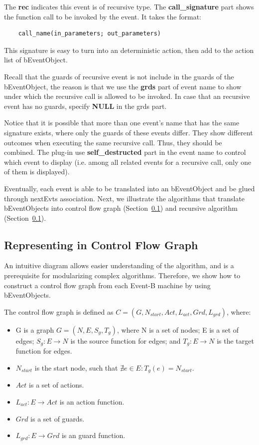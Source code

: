 \documentclass{easychair}
\begin{document}
The \textbf{rec} indicates this event is of recursive type. The \textbf{call\_signature} part shows the function call to be invoked by the event. It takes the format:
\lstset{language=[68]Algol}
\begin{lstlisting}
	call_name(in_parameters; out_parameters)
\end{lstlisting} 
This signature is easy to turn into an deterministic action, then add to the action list of bEventObject. 

Recall that the guards of recursive event is not include in the guards of the bEventObject, the reason is that we use the \textbf{grds} part of event name to show under which the recursive call is allowed to be invoked. In case that an recursive event has no guards, specify \textbf{NULL} in the grds part. 

Notice that it is possible that more than one event's name that has the same signature exists, where only the guards of these events differ. They show different outcomes when executing the same recursive call. Thus, they should be combined. The plug-in use \textbf{self\_destructed} part in the event name to control which event to display (i.e. among all related events for a recursive call, only one of them is displayed). 

Eventually, each event is able to be translated into an bEventObject and be glued through nextEvts association. Next, we illustrate the algorithms that translate bEventObjects into control flow graph (Section~\ref{}) and recursive algorithm (Section~\ref{}).


\subsection{Representing in Control Flow Graph} 
An intuitive diagram allows easier understanding of the algorithm, and is a prerequisite for modularizing complex algorithms. Therefore, we show how to construct a control flow graph from each Event-B machine by using bEventObjects.

The control flow graph is defined as $C = (G, N_{start}, Act, L_{act}, Grd, L_{grd})$, where:
\begin{itemize}
	\item G is a graph $G = (N, E, S_g, T_g)$, where N is a set of nodes; E is a set of edges; $S_g : E \rightarrow N $ is the source function for edges; and $T_g : E \rightarrow N$ is the target function for edges.
	\item $N_{start}$ is the start node, such that $\nexists e \in E : T_g(e) = N_{start}$.
	\item $Act$ is a set of actions.
	\item $L_{act} : E \rightarrow Act$ is an action function.
	\item $Grd$ is a set of guards.
	\item $L_{grd} : E \rightarrow Grd$ is an guard function.
\end{itemize}
\end{document}
